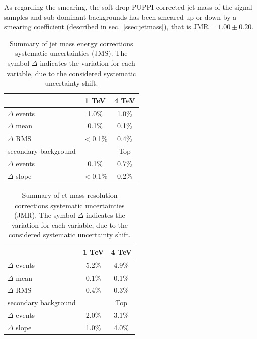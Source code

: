 \noindent As regarding the smearing, the soft drop PUPPI corrected jet mass of the signal samples and sub-dominant backgrounds has been smeared up or down by a smearing coefficient (described in sec.~\ref{ssec:jetmass}), that is $ \text{JMR} = 1.00 \pm 0.20$.
\begin{table}[!htb]
  \centering
  \caption{Summary of jet mass energy corrections systematic uncertainties (JMS). The symbol $\Delta$ indicates the variation for each variable, due to the considered systematic uncertainty shift. \label{tab:jet_mass_energy_corr}}
  \begin{tabular}{l|cc}
	\mtVZ & 1 TeV & 4 TeV \\
        \hline
	\hline
	$\Delta$ events & 1.0\% & 1.0\% \\
	$\Delta$ mean & 0.1\%& 0.1\% \\
	$\Delta$ RMS & $<$0.1\% & 0.4\% \\
	\hline
	secondary background & \VV & Top \\
        \hline
	$\Delta$ events & 0.1\% & 0.7\% \\
	$\Delta$ slope & $<$0.1\% & 0.2\% \\
  \end{tabular}

\end{table}


\begin{table}[!htb]
  \centering
  \caption{Summary of et mass resolution corrections systematic uncertainties (JMR). The symbol $\Delta$ indicates the variation for each variable, due to the considered systematic uncertainty shift. \label{tab:jet_mass_res_corr}}
  \begin{tabular}{l|cc}
	\mtVZ & 1 TeV & 4 TeV \\
        \hline
	\hline
	$\Delta$ events & 5.2\% & 4.9\% \\
	$\Delta$ mean & 0.1\%& 0.1\% \\
	$\Delta$ RMS & 0.4\% & 0.3\% \\
	\hline
	secondary background & \VV & Top \\
        \hline
	$\Delta$ events & 2.0\% & 3.1\% \\
	$\Delta$ slope & 1.0\% & 4.0\% \\
  \end{tabular}

\end{table}

